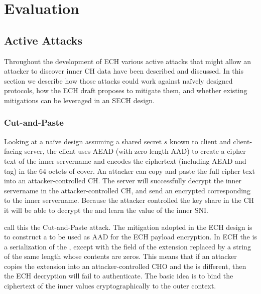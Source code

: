 \chapter{Evaluation}
\label{chap:Evaluation}


\section{Active Attacks}

\label{sec:active-attacks}
Throughout the development of \ac{ECH} various
active attacks that might allow an attacker to discover inner \ac{CH} data
have been described and discussed.
In this section we describe how those attacks could work against naïvely designed protocols,
how the \ac{ECH} draft proposes to mitigate them,
and whether existing mitigations can be leveraged in an \ac{SECH} design.

\subsection{Cut-and-Paste}
\label{sec:cut-and-paste-attacks}
Looking at a naïve design assuming a shared secret $s$ known to client and client-facing server, the client uses \ac{AEAD} (with zero-length \ac{AAD})
to create a cipher text of the inner servername and encodes the ciphertext
(including \ac{AEAD} \nonce and tag)
in the 64 octets of cover.
An attacker can copy and paste the full cipher text into an attacker-controlled \ac{CH}.
The server will successfully decrypt the inner servername in the attacker-controlled \ac{CH},
and send an encrypted  corresponding to the inner servername.
Because the attacker controlled the key share in the \ac{CH} it will be able to decrypt the
 and learn the value of the inner \ac{SNI}.

\cite{esni} call this the Cut-and-Paste attack.
The mitigation adopted in the
\ac{ECH} design is to construct a 
to be used as \ac{AAD}
for the \ac{ECH} payload encryption.
In \ac{ECH} the  is a serialization of the ,
except with the  field of the \varech extension replaced by a string of the same
length whose contents are zeros.
This means that if an attacker copies the \varech extension
into an attacker-controlled \ac{CHO} and the  is different, then
the \ac{ECH}  decryption will fail to authenticate.
The basic idea is to bind the ciphertext of the inner values cryptographically to the outer context.

